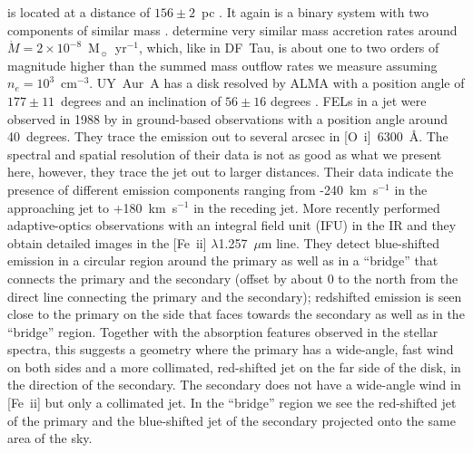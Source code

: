 \documentclass[twocolumn,trackchanges]{aastex63}
\begin{document}
 is  located at a distance of $156\pm2$~pc
\citep{2016A&A...595A...1G,2018A&A...616A...1G}. It again is a binary system
with two components of similar mass \citep[M0 and M2,
  see][]{2003ApJ...583..334H}. \citet{2003ApJ...583..334H} determine very
similar mass accretion rates around
$\dot M=2\times10^{-8}$~M$_{\sun}$~yr$^{-1}$, which, like in DF~Tau, is about
one to two orders of magnitude higher than the summed mass outflow rates we
measure assuming $n_e=10^3$~cm$^{-3}$.
UY~Aur~A has a disk resolved by ALMA with a position angle of $177\pm11$~degrees and an inclination of $56\pm16$ degrees \citep{2014ApJ...784...62A}. FELs in a jet were observed in 1988 by \citet{1997A&AS..126..437H} in ground-based observations with a position angle around 40~degrees. They trace the emission out to several arcsec in [O~{\sc i}]~6300~\AA{}. The spectral and spatial resolution of their data is not as good as what we present here, however, they trace the jet out to larger distances. Their data indicate the presence of different emission components ranging from -240~km~s$^{-1}$ in the approaching jet to +180~km~s$^{-1}$ in the receding jet. More recently \citet{2014ApJ...786...63P} performed adaptive-optics observations with an integral field unit (IFU) in the IR and they obtain detailed images in the [Fe~{\sc ii}] $\lambda$1.257~$\mu$m line. They detect blue-shifted emission in a circular region around the primary as well as in a ``bridge'' that connects the primary and the secondary (offset by about 0 to the north from the direct line connecting the primary and the secondary); redshifted emission is seen close to the primary on the side that faces towards the secondary as well as in the ``bridge'' region. Together with the absorption features observed in the stellar spectra, this suggests a geometry where the primary has a wide-angle, fast wind on both sides and a more collimated, red-shifted jet on the far side of the disk, in the direction of the secondary. The secondary does not have a wide-angle wind in [Fe~{\sc ii}] but only a collimated jet. In the ``bridge'' region we see the red-shifted jet of the primary and the blue-shifted jet of the secondary projected onto the same area of the sky.
\end{document}
